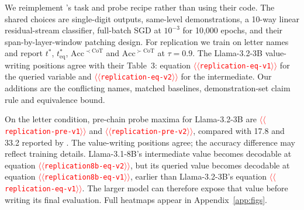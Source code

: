 \documentclass[11pt]{article}
\providecommand{\NUM}[1]{\textcolor{red}{$\langle\langle$\texttt{#1}$\rangle\rangle$}}
\begin{document}
\begin{table}[t]
\centering\small\setlength{\tabcolsep}{4pt}
\caption{The five levels of \citet{kudo2026faithful}: additions or subtractions needed
(\emph{Steps}), variables unresolved when first read (\emph{Held}), and unused equations
(\emph{Distr.}). At level~1 the intermediate value is stated rather than computed.}
\label{tab:levels}
\end{table}

We reimplement \citet{kudo2026faithful}'s task and probe recipe rather than using their code.
The shared choices are single-digit outputs, same-level demonstrations, a 10-way linear
residual-stream classifier, full-batch SGD at $10^{-3}$ for 10,000 epochs, and their
span-by-layer-window patching design. For replication we train on letter names and report
$t^{*}$, $t^{*}_{\mathrm{eq}}$, $\mathrm{Acc}^{\prec\mathrm{CoT}}$ and
$\mathrm{Acc}^{\succ\mathrm{CoT}}$ at $\tau=0.9$.
The Llama-3.2-3B value-writing positions agree with their Table~3: equation
\NUM{replication-eq-v1} for the queried variable and \NUM{replication-eq-v2} for the intermediate.
Our additions are the conflicting names, matched baselines, demonstration-set claim rule and
equivalence bound.



On the letter condition, pre-chain probe maxima for Llama-3.2-3B are
\NUM{replication-pre-v1} and \NUM{replication-pre-v2}, compared with 17.8 and 33.2 reported by
\citet{kudo2026faithful}. The value-writing positions agree; the accuracy difference may reflect
training details. Llama-3.1-8B's intermediate value becomes decodable at equation
\NUM{replication8b-eq-v2}, but its queried value becomes decodable at equation
\NUM{replication8b-eq-v1}, earlier than Llama-3.2-3B's equation \NUM{replication-eq-v1}.
The larger model can therefore expose that value before writing its final evaluation.
Full heatmaps appear in Appendix~\ref{app:figs}.
\end{document}
